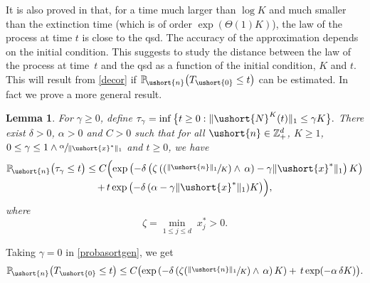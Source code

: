 \documentclass[11pt]{article}
\newcommand{\Psfrac}[2]{(\sfrac{#1}{#2})}
\numberwithin{equation}{section}
\theoremstyle{plain}
\newtheorem{lemma}[theorem]{Lemma}
\theoremstyle{definition}
\newcommand{\proba}{{\mathbb{P}}}
\newcommand{\zentiers}{{\mathbb{Z}}}
\newcommand{\domaine}{\zentiers_{+}^{d}}
\newcommand{\Thetaun}{\Theta(1)}
\newcommand{\vecn}{\ushort{n}}
\newcommand{\vecxf}{\ushort{x}^*}
\newcommand{\veczer}{\ushort{0}}
\newcommand{\leproc}{\ushort{N}^{K}}
\newcommand{\norm}[1]{\|#1\|_{1}}\let\snorm\norm
\begin{document}
It is also proved in \cite{ccm2} that, for a time much larger than $\log K$ and much smaller than the extinction time
(which is of order $\exp(\Thetaun K)$), the law of the process at time $t$ is close to the qsd. The accuracy of the
approximation depends on the initial condition. This suggests to study the distance between the law of the process at time~$t$ and
the qsd as a function of the initial condition, $K$ and $t$.
This will result from \eqref{decor} if $\proba_{\!\vecn}\bigl(T_{\veczer}\leq t\bigr)$ can be estimated. In fact we prove a more general
result.

\begin{lemma}\label{sortpas}
For $\gamma\geq 0$, define $\tau_{\gamma}=\inf\big\{t\geq 0:\| \leproc(t)\|_1\le \gamma K\big\}.$
There exist $\delta>0$, $\alpha>0$ and $C>0$ such that for all $\vecn\in\domaine$, $K\ge 1$,
$0\le \gamma\le 1\wedge \sfrac{\alpha}{\snorm{\vecxf}}$ and $t\ge0$, we have
\begin{multline}\label{probasortgen}
\proba_{\!\vecn}\bigl(\tau_{\gamma}\leq t\bigr)
\leq C\Bigl(\exp\left(-\delta\left(\zeta\left(\Psfrac{\norm{\vecn}}{K}\wedge\,\alpha\right)-\gamma \norm{\vecxf}\right)K\right)\\[-3pt]
+\, t \exp\left(-\delta\,(\alpha-\gamma \norm{\vecxf}) K\right)\Bigr),
\end{multline}
where
\begin{equation}\label{def-zeta}
\zeta=\min_{1\le j\le d}\;x^*_{j}>0.
\end{equation}
\end{lemma}
Taking $\gamma=0$ in \eqref{probasortgen}, we get
\begin{equation}\label{probasort}
\proba_{\!\vecn}\bigl(T_{\veczer}\leq t\bigr)
\leq C\bigl(\exp\left(-\delta\left(\zeta\Psfrac{\snorm{\vecn}}{K}\wedge\,\alpha\right)K\right)+\, t \exp(-\alpha\,\delta K)\bigr).
\end{equation}
\end{document}
